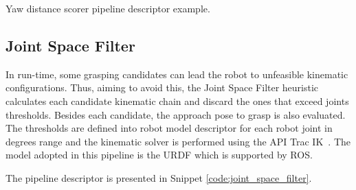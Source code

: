 \begin{snippet}[h!]
\centering
{}
\caption{Yaw distance scorer pipeline descriptor example.}
\label{code:yaw_distance_scorer}
\end{snippet}

\subsection{Joint Space Filter}
\label{cap4:modular_grasping_architecture:sec:grasp_selection:subsec:joint_space_filter}

In run-time, some grasping candidates can lead the robot to unfeasible kinematic configurations. Thus, aiming to avoid this, the Joint Space Filter heuristic calculates each candidate kinematic chain and discard the ones that exceed joints thresholds. Besides each candidate, the approach pose to grasp is also evaluated. The thresholds are defined into robot model descriptor for each robot joint in degrees range and the kinematic solver is performed using the API Trac IK~\cite{tracik}. The model adopted in this pipeline is the URDF which is supported by ROS.

The pipeline descriptor is presented in Snippet \ref{code:joint_space_filter}. 



